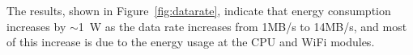 The results, shown in Figure~\ref{fig:datarate}, indicate that energy consumption increases by $\sim$1~W as the data rate increases from 1MB/s to 14MB/s, and most of this increase is due to the energy usage at the CPU and WiFi modules. 





    
%
%
%
%
%   
%


